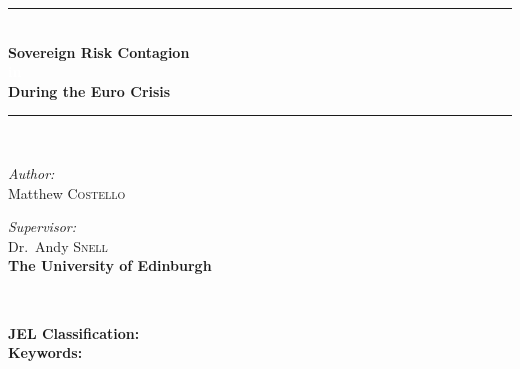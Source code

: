 \documentclass[/../base.tex]{subfiles}
\begin{document}
\begin{center}
\rule{1\textwidth}{2pt}\\
{ \LARGE \bfseries Sovereign Risk Contagion \\ \textcolor{white}{in} \\ During the Euro Crisis \\[0.4cm] }
\rule{1\textwidth}{2pt}\\[2cm]

\noindent
\begin{minipage}[t]{0.45\textwidth}
\begin{flushleft} \large
\emph{Author:}\\
Matthew \textsc{Costello}\\
\textbf{}
\end{flushleft}
\end{minipage}%
\begin{minipage}[t]{0.4\textwidth}
\begin{flushright} \large
\emph{Supervisor:} \\
Dr.~Andy \textsc{Snell}\\
\textbf{The University of Edinburgh}

\end{flushright}
\end{minipage}\\

\vfill


    \begin{abstract}
 
    \end{abstract}

\end{center}
\vfill

\noindent
\textbf{JEL Classification:}  \\
\textbf{Keywords:} 
\end{document}
